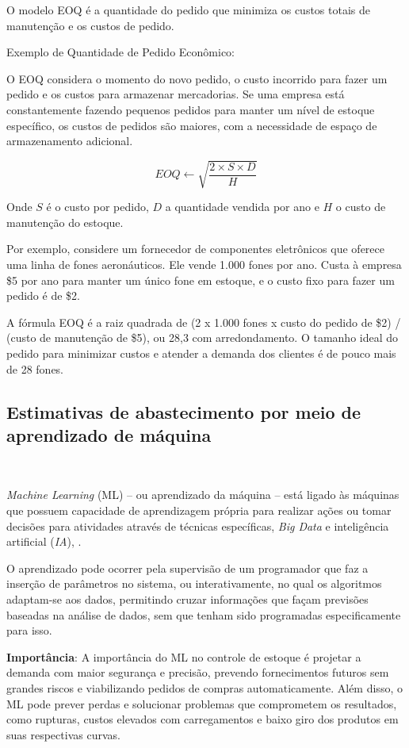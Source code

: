 \documentclass{abntex2}
\begin{document}
\begin{sloppypar}
O modelo EOQ é a quantidade do pedido que minimiza os custos totais de manutenção e os custos de pedido.

Exemplo de Quantidade de Pedido Econômico:

O EOQ considera o momento do novo pedido, o custo incorrido para fazer um pedido e os custos para armazenar mercadorias. Se uma empresa está constantemente fazendo pequenos pedidos para manter um nível de estoque específico, os custos de pedidos são maiores, com a necessidade de espaço de armazenamento adicional.

\begin{equation} \label{eq:eoq}
	EOQ \gets \sqrt{\frac{2 \times S \times D}{H}}
\end{equation}

Onde $S$ é o custo por pedido, $D$ a quantidade vendida por ano e $H$ o custo de manutenção do estoque.

Por exemplo, considere um fornecedor de componentes eletrônicos que oferece uma linha de fones aeronáuticos. Ele vende 1.000 fones por ano. Custa à empresa \$5 por ano para manter um único fone em estoque, e o custo fixo para fazer um pedido é de \$2.

A fórmula EOQ é a raiz quadrada de (2 x 1.000 fones x custo do pedido de \$2) / (custo de manutenção de \$5), ou 28,3 com arredondamento. O tamanho ideal do pedido para minimizar custos e atender a demanda dos clientes é de pouco mais de 28 fones.

\subsection{Estimativas de abastecimento por meio de aprendizado de máquina}\

\textit{Machine Learning} (ML) – ou aprendizado da máquina – está ligado às máquinas que possuem capacidade de aprendizagem própria para realizar ações ou tomar decisões para atividades através de técnicas específicas, \textit{Big Data} e inteligência artificial (\textit{IA}), \cite{Mitchell:1997}.

O aprendizado pode ocorrer pela supervisão de um programador que faz a inserção de parâmetros no sistema, ou interativamente, no qual os algoritmos adaptam-se aos dados, permitindo cruzar informações que façam previsões baseadas na análise de dados, sem que tenham sido programadas especificamente para isso.

\textbf{Importância}: A importância do ML no controle de estoque é projetar a demanda com maior segurança e precisão, prevendo fornecimentos futuros sem grandes riscos e viabilizando pedidos de compras automaticamente. Além disso, o ML pode prever perdas e solucionar problemas que comprometem os resultados, como rupturas, custos elevados com carregamentos e baixo giro dos produtos em suas respectivas curvas.


\end{sloppypar}
\end{document}
